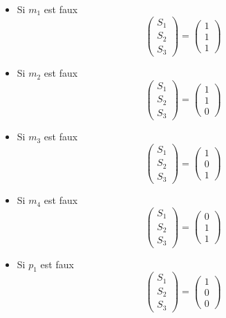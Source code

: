 \documentclass[a4paper,10pt,twocolumn]{article}
\theoremstyle{break}
\begin{document}
\begin{itemize}
 \item Si $m_1$ est faux
 $$ \left(\begin{array}{c}
 S_1\\
 S_2\\
 S_3
\end{array}\right) =
 \left(\begin{array}{c}
 1\\
 1\\
 1
\end{array}\right) $$
 \item Si $m_2$ est faux
 $$ \left(\begin{array}{c}
 S_1\\
 S_2\\
 S_3
\end{array}\right) =
 \left(\begin{array}{c}
 1\\
 1\\
 0
\end{array}\right) $$
 \item Si $m_3$ est faux
 $$ \left(\begin{array}{c}
 S_1\\
 S_2\\
 S_3
\end{array}\right) =
 \left(\begin{array}{c}
 1\\
 0\\
 1
\end{array}\right) $$
 \item Si $m_4$ est faux
 $$ \left(\begin{array}{c}
 S_1\\
 S_2\\
 S_3
\end{array}\right) =
 \left(\begin{array}{c}
 0\\
 1\\
 1
\end{array}\right) $$
 \item Si $p_1$ est faux
 $$ \left(\begin{array}{c}
 S_1\\
 S_2\\
 S_3
\end{array}\right) =
 \left(\begin{array}{c}
 1\\
 0\\
 0
\end{array}\right) $$

\end{itemize}
\end{document}
